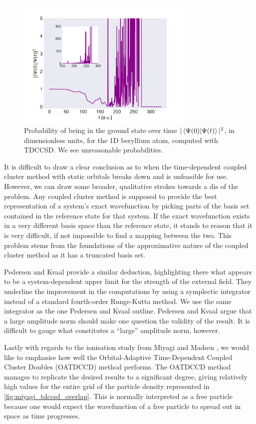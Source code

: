 \begin{figure}
    \centering
    \includegraphics[width=0.75\textwidth]{results/figures/miyagi/overlap_tdccsd.png}
    \caption{Probability of being in the ground state over time 
        $|\braket{\Psi(0)}{\Psi(t)}|^2$, in dimensionless units, for the 1D beryllium atom,
        computed with TDCCSD. 
        We see unreasonable probabilities.
    }
    \label{fig:miyagi_tdccsd_overlap}
\end{figure}

It is difficult to draw a clear conclusion as to when the time-dependent coupled cluster 
method with static orbitals breaks down and is unfeasible for use. However, we can 
draw some broader, qualitative strokes towards a dis of the problem. Any coupled 
cluster method is supposed to provide the best representation of a system's exact 
wavefunction by picking parts of the basis set contained in the reference 
state for that system. If the exact wavefunction exists in a very different basis 
space than the reference state, it stands to reason that it is very difficult, if 
not impossible to find a mapping between the two. This problem stems from the foundations 
of the approximative nature of the coupled cluster method as it has a truncated basis set. 

Pedersen and Kvaal \cite{pedersen2019symplectic} provide a similar 
deduction, highlighting there what appears to be a system-dependent upper limit for 
the strength of the external field. They underline the improvement in the computations 
by using a symplectic integrator instead of a standard fourth-order Runge-Kutta method.
We use the same integrator as the one Pedersen and Kvaal outline.
Pedersen and Kvaal argue that a large amplitude norm should make one 
question the validity of the result. It is difficult to gauge what constitutes a ``large''
amplitude norm, however.

Lastly with regards to the ionisation study from Miyagi and Madsen \cite{miyagi2013time},
we would like to emphasise how well the Orbital-Adaptive Time-Dependent Coupled Cluster 
Doubles (OATDCCD) method performs. The OATDCCD method manages to replicate the desired results 
to a significant degree, giving relatively high values for the entire grid 
of the particle density represented in \autoref{fig:miyagi_tdccsd_overlap}. This is 
normally interpreted as a free particle because one would expect the wavefunction of 
a free particle to spread out in space as time progresses.

\clearemptydoublepage
